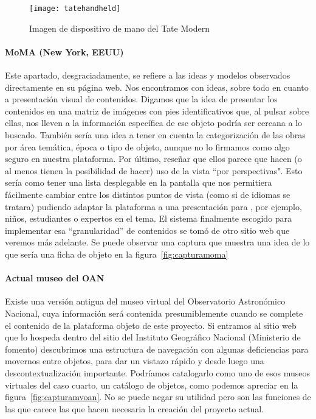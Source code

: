 \begin{figure}
\centering
\texttt{[image: tatehandheld]}
\caption{Imagen de dispositivo de mano del Tate Modern\cite{references:tatehandheld}}
\label{fig:tatehandheld}
\end{figure}



\paragraph{MoMA (New York, EEUU)}
\par Este apartado, desgraciadamente, se refiere a las ideas y modelos observados directamente en su página web. Nos encontramos con ideas, sobre todo en cuanto a presentación visual de contenidos. Digamos que la idea de presentar los contenidos en una matriz de imágenes con pies identificativos que, al pulsar sobre ellas, nos lleven a la información específica de ese objeto podría ser cercana a lo buscado. También sería una idea a tener en cuenta la categorización de las obras por área temática, época o tipo de objeto, aunque no lo firmamos como algo seguro en nuestra plataforma. Por último, reseñar que ellos parece que hacen (o al menos tienen la posibilidad de hacer) uso de la vista ``por perspectivas". Esto sería como tener una lista desplegable en la pantalla que nos permitiera fácilmente cambiar entre los distintos puntos de vista (como si de idiomas se tratara) pudiendo adaptar la plataforma a una presentación para , por ejemplo, niños, estudiantes o expertos en el tema. El sistema finalmente escogido para implementar esa ``granularidad'' de contenidos se tomó de otro sitio web que veremos más adelante. Se puede observar una captura que muestra una idea de lo que sería una ficha de objeto en la figura~\ref{fig:capturamoma}




\paragraph{Actual museo del OAN}
\par Existe una versión antigua del museo virtual del Observatorio Astronómico Nacional, cuya información será contenida presumiblemente cuando se complete el contenido de la plataforma objeto de este proyecto. Si entramos al sitio web que lo hospeda dentro del sitio del Instituto Geográfico Nacional (Ministerio de fomento) descubrimos una estructura de navegación con algunas deficiencias para movernos entre objetos, para dar un vistazo rápido y desde luego una descontextualización importante. Podríamos catalogarlo como uno de esos museos virtuales del caso cuarto, un catálogo de objetos, como podemos apreciar en la figura~\ref{fig:capturamvoan}. No se puede negar su utilidad pero son las funciones de las que carece las que hacen necesaria la creación del proyecto actual.

